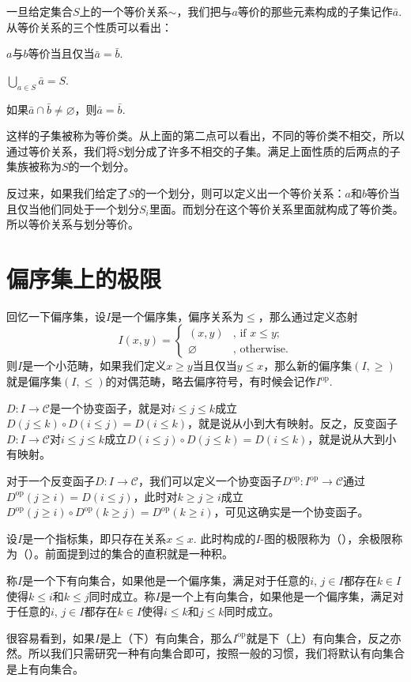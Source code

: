 \para 一旦给定集合$S$上的一个等价关系$\sim$，我们把与$a$等价的那些元素构成的子集记作$\bar{a}$. 从等价关系的三个性质可以看出：
\begin{compactitem}
\item $a$与$b$等价当且仅当$\bar{a}=\bar{b}$. 
\item $\bigcup_{a\in S}\bar{a}=S$.
\item 如果$\bar{a}\cap \bar{b}\neq \varnothing$，则$\bar{a}=\bar{b}$.
\end{compactitem}
这样的子集被称为等价类。从上面的第二点可以看出，不同的等价类不相交，所以通过等价关系，我们将$S$划分成了许多不相交的子集。满足上面性质的后两点的子集族被称为$S$的一个划分。

\para 反过来，如果我们给定了$S$的一个划分，则可以定义出一个等价关系：$a$和$b$等价当且仅当他们同处于一个划分$S_i$里面。而划分在这个等价关系里面就构成了等价类。所以等价关系与划分等价。

\section{偏序集上的极限}

\para 回忆一下偏序集，设$I$是一个偏序集，偏序关系为$\leq$，那么通过定义态射
\[
	{I}\left(x,y\right)=\begin{cases}
	(x,y)&\text{, if }x\leq y\text{;}\\
	\varnothing&\text{, otherwise}.
	\end{cases}
\]
则$I$是一个小范畴，如果我们定义$x\geq y$当且仅当$y\leq x$，那么新的偏序集$(I,\geq)$就是偏序集$(I,\leq)$的对偶范畴，略去偏序符号，有时候会记作$I^{\mathrm{op}}$.

$D:I\to \mathcal{C}$是一个协变函子，就是对$i\leq j\leq k$成立$D(j\leq k)\circ D(i\leq j)=D(i\leq k)$，就是说从小到大有映射。反之，反变函子$D:I\to \mathcal{C}$对$i\leq j\leq k$成立$D(i\leq j)\circ D(j\leq k)=D(i\leq k)$，就是说从大到小有映射。

对于一个反变函子$D:I\to \mathcal{C}$，我们可以定义一个协变函子$D^{\mathrm{op}} :I^{\mathrm{op}}\to \mathcal{C}$通过$D^{\mathrm{op}}(j\geq i)=D(i\leq j)$，此时对$k\geq j\geq i$成立$D^{\mathrm{op}}(j\geq i)\circ D^{\mathrm{op}}(k\geq j)=D^{\mathrm{op}}(k\geq i)$，可见这确实是一个协变函子。

\para 设$I$是一个指标集，即只存在关系$x\leq x$. 此时构成的$I$-图的极限称为（），余极限称为（）。前面提到过的集合的直积就是一种积。

\begin{para}
称$I$是一个下有向集合，如果他是一个偏序集，满足对于任意的$i$, $j\in I$都存在$k\in I$使得$k\leq i$和$k\leq j$同时成立。称$I$是一个上有向集合，如果他是一个偏序集，满足对于任意的$i$, $j\in I$都存在$k\in I$使得$i\leq k$和$j\leq k$同时成立。

很容易看到，如果$I$是上（下）有向集合，那么$I^{\mathrm{op}}$就是下（上）有向集合，反之亦然。所以我们只需研究一种有向集合即可，按照一般的习惯，我们将默认有向集合是上有向集合。
\end{para}

